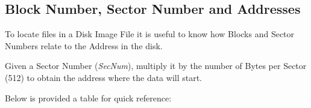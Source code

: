     \subsection{Block Number, Sector Number and Addresses}

    To locate files in a Disk Image File it is useful to know how Blocks and
    Sector Numbers relate to the Address in the disk.

    Given a Sector Number (\textit{SecNum}), multiply it by the number of Bytes
    per Sector (512) to obtain the address where the data will start.

    Below is provided a table for quick reference:


